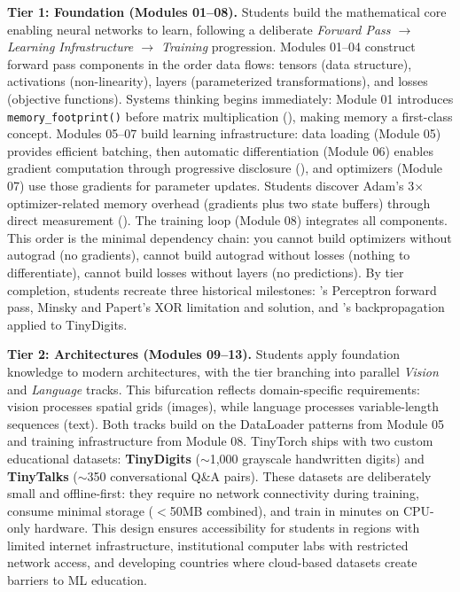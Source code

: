 \documentclass[10pt,twocolumn]{article}
\begin{document}
\textbf{Tier 1: Foundation (Modules 01--08).}
Students build the mathematical core enabling neural networks to learn, following a deliberate \emph{Forward Pass $\rightarrow$ Learning Infrastructure $\rightarrow$ Training} progression. Modules 01--04 construct forward pass components in the order data flows: tensors (data structure), activations (non-linearity), layers (parameterized transformations), and losses (objective functions). Systems thinking begins immediately: Module 01 introduces \texttt{memory\_footprint()} before matrix multiplication (), making memory a first-class concept. Modules 05--07 build learning infrastructure: data loading (Module 05) provides efficient batching, then automatic differentiation (Module 06) enables gradient computation through progressive disclosure (), and optimizers (Module 07) use those gradients for parameter updates. Students discover Adam's 3$\times$ optimizer-related memory overhead (gradients plus two state buffers) through direct measurement (). The training loop (Module 08) integrates all components. This order is the minimal dependency chain: you cannot build optimizers without autograd (no gradients), cannot build autograd without losses (nothing to differentiate), cannot build losses without layers (no predictions). By tier completion, students recreate three historical milestones: \citet{rosenblatt1958}'s Perceptron forward pass, Minsky and Papert's XOR limitation and solution, and \citet{rumelhart1986}'s backpropagation applied to TinyDigits.

\textbf{Tier 2: Architectures (Modules 09--13).}
Students apply foundation knowledge to modern architectures, with the tier branching into parallel \emph{Vision} and \emph{Language} tracks. This bifurcation reflects domain-specific requirements: vision processes spatial grids (images), while language processes variable-length sequences (text). Both tracks build on the DataLoader patterns from Module 05 and training infrastructure from Module 08. TinyTorch ships with two custom educational datasets: \textbf{TinyDigits} ($\sim$1,000 grayscale handwritten digits) and \textbf{TinyTalks} ($\sim$350 conversational Q\&A pairs). These datasets are deliberately small and offline-first: they require no network connectivity during training, consume minimal storage ($<$50MB combined), and train in minutes on CPU-only hardware. This design ensures accessibility for students in regions with limited internet infrastructure, institutional computer labs with restricted network access, and developing countries where cloud-based datasets create barriers to ML education.
\end{document}
